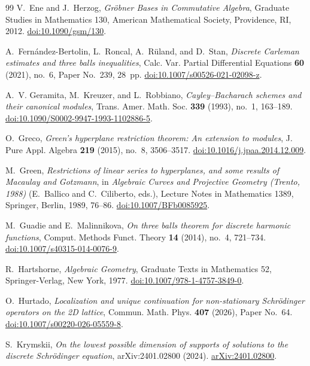 \documentclass[11pt,reqno]{amsart}
\theoremstyle{definition}
\theoremstyle{plain}
\numberwithin{equation}{section}
\begin{document}
\begin{thebibliography}{99}
V.~Ene and J.~Herzog,
\emph{Gr\"obner Bases in Commutative Algebra},
Graduate Studies in Mathematics 130,
American Mathematical Society, Providence, RI, 2012.
\href{https://doi.org/10.1090/gsm/130}
{doi:10.1090/gsm/130}.

A.~Fern{\'a}ndez-Bertolin, L.~Roncal, A.~R\"uland, and D.~Stan,
\emph{Discrete Carleman estimates and three balls inequalities},
Calc. Var. Partial Differential Equations \textbf{60} (2021), no.~6,
Paper No.~239, 28~pp.
\href{https://doi.org/10.1007/s00526-021-02098-z}
{doi:10.1007/s00526-021-02098-z}.

A.~V. Geramita, M.~Kreuzer, and L.~Robbiano,
\emph{Cayley--Bacharach schemes and their canonical modules},
Trans. Amer. Math. Soc. \textbf{339} (1993), no.~1, 163--189.
\href{https://doi.org/10.1090/S0002-9947-1993-1102886-5}
{doi:10.1090/S0002-9947-1993-1102886-5}.

O.~Greco,
\emph{Green's hyperplane restriction theorem: An extension to modules},
J. Pure Appl. Algebra \textbf{219} (2015), no.~8, 3506--3517.
\href{https://doi.org/10.1016/j.jpaa.2014.12.009}
{doi:10.1016/j.jpaa.2014.12.009}.

M.~Green,
\emph{Restrictions of linear series to hyperplanes, and some results of
Macaulay and Gotzmann},
in \emph{Algebraic Curves and Projective Geometry (Trento, 1988)}
(E.~Ballico and C.~Ciliberto, eds.),
Lecture Notes in Mathematics 1389,
Springer, Berlin, 1989, 76--86.
\href{https://doi.org/10.1007/BFb0085925}
{doi:10.1007/BFb0085925}.

M.~Guadie and E.~Malinnikova,
\emph{On three balls theorem for discrete harmonic functions},
Comput. Methods Funct. Theory \textbf{14} (2014), no.~4, 721--734.
\href{https://doi.org/10.1007/s40315-014-0076-9}
{doi:10.1007/s40315-014-0076-9}.

R.~Hartshorne,
\emph{Algebraic Geometry},
Graduate Texts in Mathematics 52,
Springer-Verlag, New York, 1977.
\href{https://doi.org/10.1007/978-1-4757-3849-0}
{doi:10.1007/978-1-4757-3849-0}.

O.~Hurtado,
\emph{Localization and unique continuation for non-stationary
Schr\"odinger operators on the 2D lattice},
Commun. Math. Phys. \textbf{407} (2026), Paper No.~64.
\href{https://doi.org/10.1007/s00220-026-05559-8}
{doi:10.1007/s00220-026-05559-8}.

S.~Krymskii,
\emph{On the lowest possible dimension of supports of solutions to the
discrete Schr\"odinger equation},
arXiv:2401.02800 (2024).
\href{https://arxiv.org/abs/2401.02800}
{arXiv:2401.02800}.


\end{thebibliography}
\end{document}
